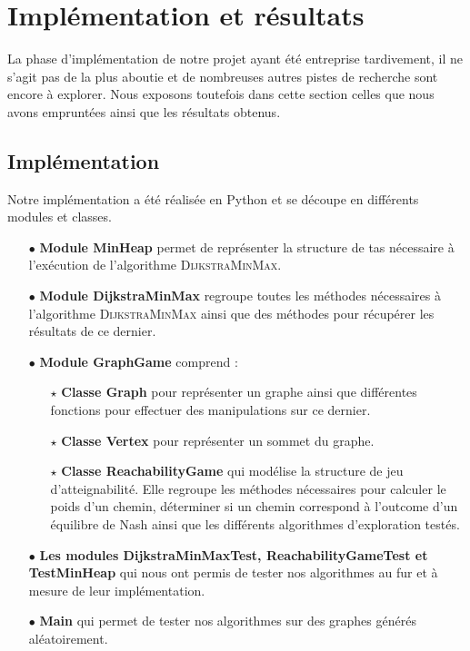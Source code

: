 
\section{Implémentation et résultats}
\label{section:implementation}

La phase d'implémentation de notre projet ayant été entreprise tardivement, il ne s'agit pas de la plus aboutie et de nombreuses autres pistes de recherche sont encore à explorer. Nous exposons toutefois dans cette section celles que nous avons empruntées ainsi que les résultats obtenus.

\subsection{Implémentation} 
Notre implémentation a été réalisée en Python et se découpe en différents modules et classes.

\begin{itemize}
	
	\item[$\bullet$]\textbf{Module MinHeap} permet de représenter la structure de tas nécessaire à l'exécution de l'algorithme \textsc{DijkstraMinMax}. 
	\item[$\bullet$]\textbf{Module DijkstraMinMax} regroupe toutes les méthodes nécessaires à l'algorithme \textsc{DijkstraMinMax} ainsi que des méthodes pour récupérer les résultats de ce dernier.
	\item[$\bullet$]\textbf{Module GraphGame} comprend :
	\begin{itemize}
		\item[$\star$] \textbf{Classe Graph} pour représenter un graphe ainsi que différentes fonctions pour effectuer des manipulations sur ce dernier.
		\item[$\star$] \textbf{Classe Vertex} pour représenter un sommet du graphe.
		\item[$\star$] \textbf{Classe ReachabilityGame} qui modélise la structure de jeu d'atteignabilité. Elle regroupe les méthodes nécessaires pour calculer le poids d'un chemin, déterminer si un chemin correspond à l'outcome d'un équilibre de Nash ainsi que les différents algorithmes d'exploration testés.
	\end{itemize}
	
	\item[$\bullet$] \textbf{Les modules DijkstraMinMaxTest, ReachabilityGameTest et TestMinHeap} qui nous ont permis de tester nos algorithmes au fur et à mesure de leur implémentation.
	\item[$\bullet$] \textbf{Main} qui permet de tester nos algorithmes sur des graphes générés aléatoirement.
\end{itemize}

